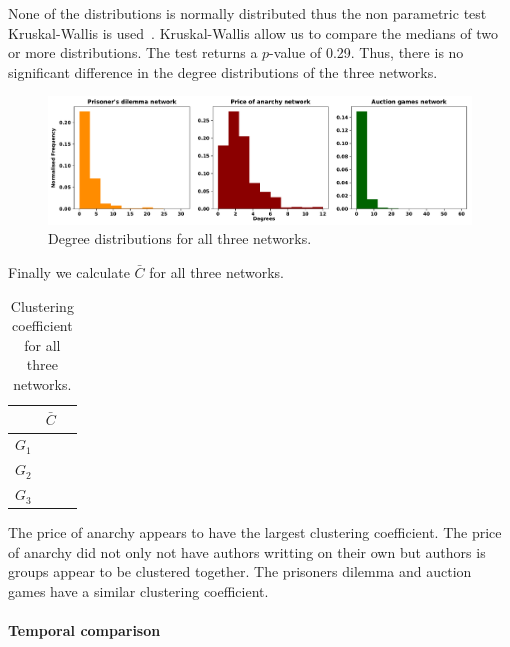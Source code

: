 \documentclass{article}
\theoremstyle{definition}
\newcommand{\prisonerscc}{}
\newcommand{\pricecc}{}
\newcommand{\auctioncc}{}
\begin{document}
None of the distributions is normally distributed thus the non parametric test
Kruskal-Wallis is used~\cite{mckight2010}. Kruskal-Wallis allow us to compare the
medians of two or more distributions. The test returns a \(p\)-value of 0.29.
Thus, there is no significant difference in the degree distributions of the
three networks.

\begin{figure}[!hbtp]
    \centering
    \includegraphics[width=\textwidth]{./assets/images/degrees_histrograms.pdf}
    \caption{Degree distributions for all three networks.}\label{fig:degrees_dist}
\end{figure}

Finally we calculate \(\bar{C}\) for all three networks.

\begin{table}[!hbtp]
    \begin{center}
    \begin{tabular}{lcc}
        \toprule
                  & \textbf{\(\bar{C}\)}\\
        \midrule 
        \(G_1\) & \prisonerscc\\
        \(G_2\) & \auctioncc\\
        \(G_3\) & \pricecc\\
        \bottomrule
    \end{tabular}
    \end{center}
    \caption{Clustering coefficient for all three networks.}
    \label{table:clustering}
\end{table}

The price of anarchy appears to have the largest clustering coefficient.
The price of anarchy did not only not have authors writting on their own
but authors is groups appear to be clustered together. The prisoners dilemma 
and auction games have a similar clustering coefficient.

\paragraph{Temporal comparison}
\mbox{ }\\
\end{document}
